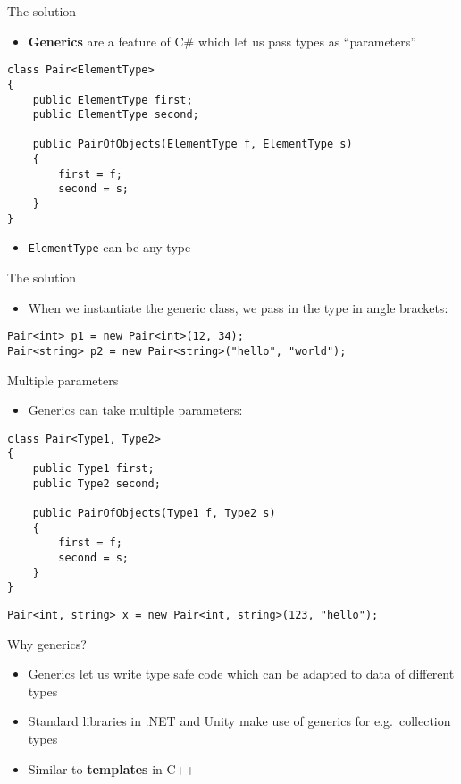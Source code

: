 \begin{frame}[fragile]{The solution}
    \begin{itemize}
        \pause\item \textbf{Generics} are a feature of C\# which let us pass types as ``parameters''
    \end{itemize}
    \pause
    \begin{lstlisting}
class Pair<ElementType>
{
    public ElementType first;
    public ElementType second;
    
    public PairOfObjects(ElementType f, ElementType s)
    {
        first = f;
        second = s;
    }
}
    \end{lstlisting}
    \begin{itemize}
        \pause\item \lstinline{ElementType} can be any type
    \end{itemize}
\end{frame}

\begin{frame}[fragile]{The solution}
    \begin{itemize}
        \pause\item When we instantiate the generic class, we pass in the type in angle brackets:
    \end{itemize}
    \pause
    \begin{lstlisting}
Pair<int> p1 = new Pair<int>(12, 34);
Pair<string> p2 = new Pair<string>("hello", "world");
    \end{lstlisting}
\end{frame}

\begin{frame}[fragile]{Multiple parameters}
    \begin{itemize}
        \pause\item Generics can take multiple parameters:
    \end{itemize}
    \pause
    \begin{lstlisting}
class Pair<Type1, Type2>
{
    public Type1 first;
    public Type2 second;
    
    public PairOfObjects(Type1 f, Type2 s)
    {
        first = f;
        second = s;
    }
}
    \end{lstlisting}
    \begin{lstlisting}
Pair<int, string> x = new Pair<int, string>(123, "hello");
    \end{lstlisting}
\end{frame}

\begin{frame}{Why generics?}
    \begin{itemize}
        \pause\item Generics let us write type safe code which can be adapted to data of different types
        \pause\item Standard libraries in .NET and Unity make use of generics for e.g.\ collection types
        \pause\item Similar to \textbf{templates} in C++
    \end{itemize}
\end{frame}

